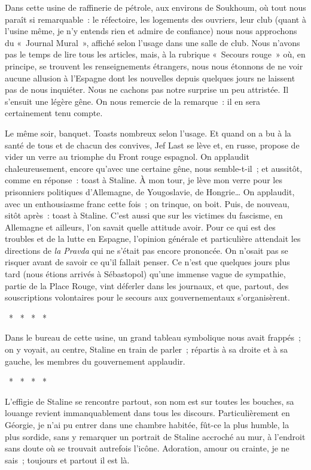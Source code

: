 \documentclass[french,twoside]{book} %
\newcommand\chaptercont{} %
\begin{document}
\chaptercont
\noindent Dans cette usine de raffinerie de pétrole, aux environs de Soukhoum, où tout nous paraît si remarquable : le réfectoire, les logements des ouvriers, leur club (quant à l’usine même, je n’y entends rien et admire de confiance) nous nous approchons du « Journal Mural », affiché selon l’usage dans une salle de club. Nous n’avons pas le temps de lire tous les articles, mais, à la rubrique « Secours rouge » où, en principe, se trouvent les renseignements étrangers, nous nous étonnons de ne voir aucune allusion à l’Espagne dont les nouvelles depuis quelques jours ne laissent pas de nous inquiéter. Nous ne cachons pas notre surprise un peu attristée. Il s’ensuit une légère gêne. On nous remercie de la remarque : il en sera certainement tenu compte.\par
Le même soir, banquet. Toasts nombreux selon l’usage. Et quand on a bu à la santé de tous et de chacun des convives, Jef Last se lève et, en russe, propose de vider un verre au triomphe du Front rouge espagnol. On applaudit chaleureusement, encore qu’avec une certaine gêne, nous semble-t-il ; et aussitôt, comme en réponse : toast à Staline. À mon tour, je lève mon verre pour les prisonniers politiques d’Allemagne, de Yougoslavie, de Hongrie… On applaudit, avec un enthousiasme franc cette fois ; on trinque, on boit. Puis, de nouveau, sitôt après : toast à Staline. C’est aussi que sur les victimes du fascisme, en Allemagne et ailleurs, l’on savait quelle attitude avoir. Pour ce qui est des troubles et de la lutte en Espagne, l’opinion générale et particulière attendait les directions de \emph{la Pravda} qui ne s’était pas encore prononcée. On n’osait pas se risquer avant de savoir ce qu’il fallait penser. Ce n’est que quelques jours plus tard (nous étions arrivés à Sébastopol) qu’une immense vague de sympathie, partie de la Place Rouge, vint déferler dans les journaux, et que, partout, des souscriptions volontaires pour le secours aux gouvernementaux s’organisèrent.\par
{\centering \noindent *  *  *  *  *\par}
\noindent Dans le bureau de cette usine, un grand tableau symbolique nous avait frappés ; on y voyait, au centre, Staline en train de parler ; répartis à sa droite et à sa gauche, les membres du gouvernement applaudir.\par
{\centering \noindent *  *  *  *  *\par}
\noindent L’effigie de Staline se rencontre partout, son nom est sur toutes les bouches, sa louange revient immanquablement dans tous les discours. Particulièrement en Géorgie, je n’ai pu entrer dans une chambre habitée, fût-ce la plus humble, la plus sordide, sans y remarquer un portrait de Staline accroché au mur, à l’endroit sans doute où se trouvait autrefois l’icône. Adoration, amour ou crainte, je ne sais ; toujours et partout il est là.\par
\end{document}
